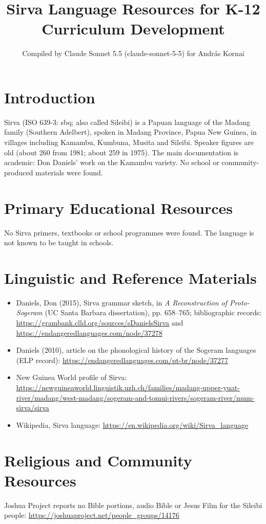 \documentclass[12pt]{article}
\title{Sirva Language Resources for K-12 Curriculum Development}
\author{Compiled by Claude Sonnet 5.5 (claude-sonnet-5-5) for Andr\'as Kornai}
\date{}
\begin{document}
\maketitle

\section{Introduction}
Sirva (ISO 639-3: sbq; also called Sileibi) is a Papuan language of the Madang family (Southern Adelbert), spoken in Madang Province, Papua New Guinea, in villages including Kamambu, Kumbuna, Musita and Sileibi. Speaker figures are old (about 260 from 1981; about 259 in 1975). The main documentation is academic: Don Daniels' work on the Kamambu variety. No school or community-produced materials were found.

\section{Primary Educational Resources}
No Sirva primers, textbooks or school programmes were found. The language is not known to be taught in schools.

\section{Linguistic and Reference Materials}
\begin{itemize}
\item Daniels, Don (2015), Sirva grammar sketch, in \emph{A Reconstruction of Proto-Sogeram} (UC Santa Barbara dissertation), pp. 658--765; bibliographic records: \url{https://grambank.clld.org/sources/sDanielsSirva} and \url{https://endangeredlanguages.com/node/37278}
\item Daniels (2010), article on the phonological history of the Sogeram languages (ELP record): \url{https://endangeredlanguages.com/pt-br/node/37277}
\item New Guinea World profile of Sirva: \url{https://newguineaworld.linguistik.uzh.ch/families/madang-upper-yuat-river/madang/west-madang/sogeram-and-tomui-rivers/sogeram-river/mum-sirva/sirva}
\item Wikipedia, Sirva language: \url{https://en.wikipedia.org/wiki/Sirva_language}
\end{itemize}

\section{Religious and Community Resources}
Joshua Project reports no Bible portions, audio Bible or Jesus Film for the Sileibi people: \url{https://joshuaproject.net/people_groups/14176}
\end{document}
